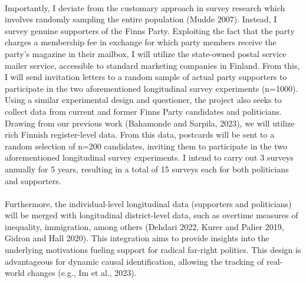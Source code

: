 \documentclass[letterpaper]{article}
\begin{document}
\paragraph{}Importantly, I deviate from the customary approach in survey research which involves randomly sampling the entire population (Mudde 2007). Instead, I survey genuine supporters of the Finns Party. Exploiting the fact that the party charges a membership fee in exchange for which party members receive the party's magazine in their mailbox, I will utilize the state-owned postal service mailer service, accessible to standard marketing companies in Finland. From this, I will send invitation letters to a random sample of actual party supporters to participate in the two aforementioned longitudinal survey experiments (n=1000). Using a similar experimental design and questioner, the project also seeks to collect data from current and former Finns Party candidates and politicians. Drawing from our previous work (Bahamonde and Sarpila, 2023), we will utilize rich Finnish register-level data. From this data, postcards will be sent to a random selection of n=200 candidates, inviting them to participate in the two aforementioned longitudinal survey experiments. I intend to carry out 3 surveys annually for 5 years, resulting in a total of 15 surveys each for both politicians and supporters.

\paragraph{}Furthermore, the individual-level longitudinal data (supporters and politicians) will be merged with longitudinal district-level data, such as overtime measures of inequality, immigration, among others (Dehdari 2022, Kurer and Palier 2019, Gidron and Hall 2020). This integration aims to provide insights into the underlying motivations fueling support for radical far-right politics. This design is advantageous for dynamic causal identification, allowing the tracking of real-world changes (e.g., Im et al., 2023).

\end{document}
